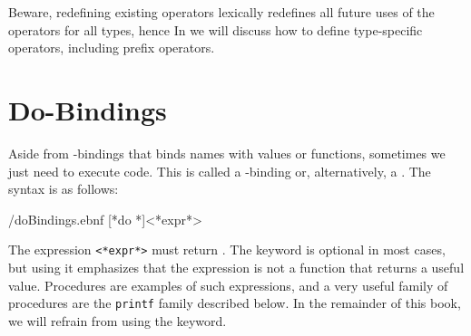 \documentclass[fsharpnotes.tex]{subfiles}
\begin{document}
Beware, redefining existing operators lexically redefines all future uses of the operators for all types, hence  In  we will discuss how to define type-specific operators, including prefix operators. 

\section{Do-Bindings}
Aside from -bindings that binds names with values or functions, sometimes we just need to execute code. This is called a -binding or, alternatively, a . The syntax is as follows:
%
\begin{verbatimwrite}{\ebnf/doBindings.ebnf}
[*do *]<*expr*>
\end{verbatimwrite}
%
The expression \lstinline[language=syntax]{<*expr*>} must return . The keyword  is optional in most cases, but using it emphasizes that the expression is not a function that returns a useful value. Procedures are examples of such expressions, and a very useful family of procedures are the \lstinline{printf} family described below. In the remainder of this book, we will refrain from using the  keyword.
\end{document}
